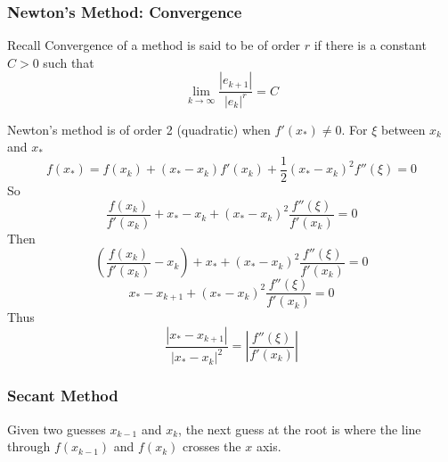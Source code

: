 \documentclass[10pt]{beamer}
\begin{document}
\begin{frame}[shrink]
\frametitle{Newton's Method: Convergence}
\begin{block}{Recall}
  Convergence of a method is said to be of order $r$ if there is a
constant $C>0$ such that
\begin{equation*}
  \lim_{k\rightarrow \infty} \frac{|e_{k+1}|}{|e_k|^r} = C
\end{equation*}
\end{block}
Newton's method is of order 2 (quadratic) when $f'(x_{*}) \ne 0$.
\bigskip
For $\xi$ between $x_k$ and $x_{*}$
\begin{equation*}
  f(x_{*}) = f(x_k) + (x_{*}-x_k)f'(x_k) + \frac{1}{2}(x_{*}-x_k)^2 f''(\xi) = 0
\end{equation*}
So
\begin{equation*}
  \frac{f(x_k)}{f'(x_k)} + x_{*}-x_k + (x_{*}-x_k)^2 \frac{f''(\xi)}{f'(x_k)} = 0
\end{equation*}
Then
\begin{equation*}
  \left(\frac{f(x_k)}{f'(x_k)} -x_k\right)+ x_{*} + (x_{*}-x_k)^2 \frac{f''(\xi)}{f'(x_k)} = 0
\end{equation*}
\begin{equation*}
  x_{*}-x_{k+1} + (x_{*}-x_k)^2 \frac{f''(\xi)}{f'(x_k)} = 0
\end{equation*}
Thus
\begin{equation*}
  \frac{\left|x_{*}-x_{k+1}\right|}{\left|x_{*}-x_k\right|^2}  = \left|\frac{f''(\xi)}{f'(x_k)}\right|
\end{equation*}
\end{frame}
\begin{frame}
\frametitle{Secant Method}

\vspace{4ex}
\begin{center}
\end{center}

Given two guesses $x_{k-1}$ and $x_k$, the next guess at the root
is where the line through $f(x_{k-1})$ and $f(x_k)$
crosses the $x$ axis.



\end{frame}
\end{document}
